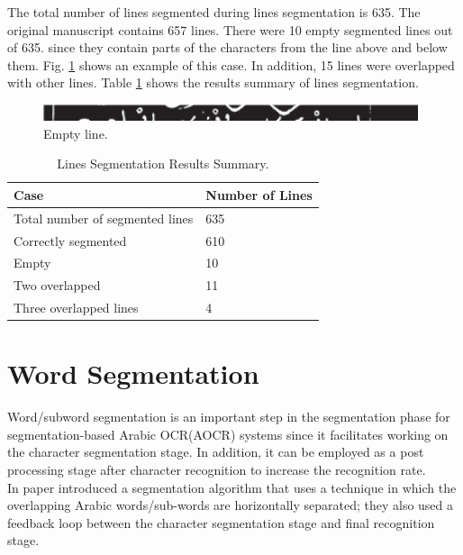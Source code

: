 The total number of lines segmented during lines segmentation is 635. The original manuscript contains 657 lines. There were 10 empty segmented lines out of 635. since they contain
parts of the characters from the line above and below them.
Fig. \ref{fig:pp_empty} shows an example of this case. In addition, 15 lines
were overlapped with other lines. Table \ref{table:1} shows the results
summary of lines segmentation.

\begin{figure}[!htb]
    \centering
    \includegraphics[width=11cm]{images/pp_empty.png}
    \caption{Empty line.}
    \label{fig:pp_empty}
\end{figure}

\begin{table}[!htb]
\centering
\begin{tabular}{|l|l|}
\hline
\textbf{Case}                   & \textbf{Number of Lines} \\ \hline
Total number of segmented lines & 635                      \\ \hline
Correctly segmented             & 610                      \\ \hline
Empty                           & 10                       \\ \hline
Two overlapped                  & 11                       \\ \hline
Three overlapped lines          & 4                        \\ \hline
\end{tabular}
\caption{Lines Segmentation Results Summary.}
\label{table:1}
\end{table}


\section{Word Segmentation}
Word/subword segmentation is an important step in the segmentation phase for segmentation-based Arabic OCR(AOCR) systems since it facilitates working on the character segmentation stage. In addition, it can be employed as a post processing stage after character recognition to increase the recognition rate.\\

In paper \cite{article} 
introduced a segmentation algorithm that uses a technique in which the overlapping Arabic words/sub-words are horizontally separated; they also used a feedback loop between the character segmentation stage and final recognition stage. 

